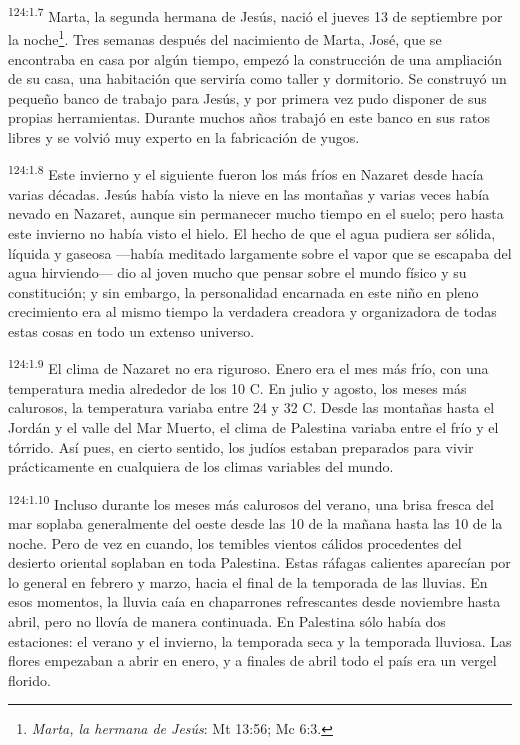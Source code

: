 \par
\textsuperscript{124:1.7} Marta, la segunda hermana de Jesús, nació el jueves 13 de septiembre por la noche\footnote{\textit{Marta, la hermana de Jesús}: Mt 13:56; Mc 6:3.}. Tres semanas después del nacimiento de Marta, José, que se encontraba en casa por algún tiempo, empezó la construcción de una ampliación de su casa, una habitación que serviría como taller y dormitorio. Se construyó un pequeño banco de trabajo para Jesús, y por primera vez pudo disponer de sus propias herramientas. Durante muchos años trabajó en este banco en sus ratos libres y se volvió muy experto en la fabricación de yugos.

\par
\textsuperscript{124:1.8} Este invierno y el siguiente fueron los más fríos en Nazaret desde hacía varias décadas. Jesús había visto la nieve en las montañas y varias veces había nevado en Nazaret, aunque sin permanecer mucho tiempo en el suelo; pero hasta este invierno no había visto el hielo. El hecho de que el agua pudiera ser sólida, líquida y gaseosa ---había meditado largamente sobre el vapor que se escapaba del agua hirviendo--- dio al joven mucho que pensar sobre el mundo físico y su constitución; y sin embargo, la personalidad encarnada en este niño en pleno crecimiento era al mismo tiempo la verdadera creadora y organizadora de todas estas cosas en todo un extenso universo.

\par
\textsuperscript{124:1.9} El clima de Nazaret no era riguroso. Enero era el mes más frío, con una temperatura media alrededor de los 10{\textdegree} C. En julio y agosto, los meses más calurosos, la temperatura variaba entre 24{\textdegree} y 32{\textdegree} C. Desde las montañas hasta el Jordán y el valle del Mar Muerto, el clima de Palestina variaba entre el frío y el tórrido. Así pues, en cierto sentido, los judíos estaban preparados para vivir prácticamente en cualquiera de los climas variables del mundo.

\par
\textsuperscript{124:1.10} Incluso durante los meses más calurosos del verano, una brisa fresca del mar soplaba generalmente del oeste desde las 10 de la mañana hasta las 10 de la noche. Pero de vez en cuando, los temibles vientos cálidos procedentes del desierto oriental soplaban en toda Palestina. Estas ráfagas calientes aparecían por lo general en febrero y marzo, hacia el final de la temporada de las lluvias. En esos momentos, la lluvia caía en chaparrones refrescantes desde noviembre hasta abril, pero no llovía de manera continuada. En Palestina sólo había dos estaciones: el verano y el invierno, la temporada seca y la temporada lluviosa. Las flores empezaban a abrir en enero, y a finales de abril todo el país era un vergel florido.

